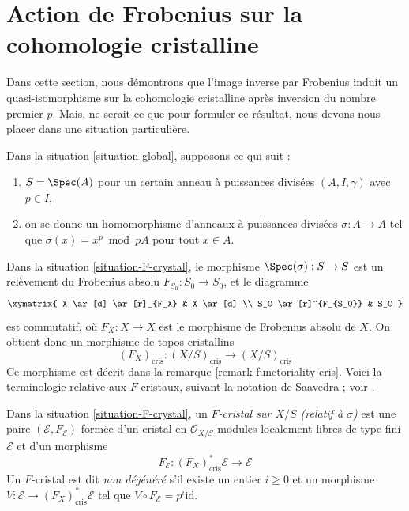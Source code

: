 \section{Action de Frobenius sur la cohomologie cristalline}
\label{section-frobenius}

\noindent
Dans cette section, nous démontrons que l'image inverse par Frobenius induit un quasi-isomorphisme
sur la cohomologie cristalline après inversion du nombre premier $p$. Mais, ne serait-ce que
pour formuler ce résultat, nous devons nous placer dans une situation particulière.

\begin{situation}
\label{situation-F-crystal}
Dans la situation \ref{situation-global}, supposons ce qui suit :
\begin{enumerate}
\item $S = \Spec(A)$ pour un certain anneau à puissances divisées $(A, I, \gamma)$
avec $p \in I$,
\item on se donne un homomorphisme d'anneaux à puissances divisées $\sigma : A \to A$
tel que $\sigma(x) = x^p \bmod pA$ pour tout $x \in A$.
\end{enumerate}
\end{situation}

\noindent
Dans la situation \ref{situation-F-crystal}, le morphisme
$\Spec(\sigma) : S \to S$ est un relèvement du Frobenius absolu
$F_{S_0} : S_0 \to S_0$, et le diagramme
$$
\xymatrix{
X \ar[d] \ar[r]_{F_X} & X \ar[d] \\
S_0 \ar[r]^{F_{S_0}} & S_0
}
$$
est commutatif, où $F_X : X \to X$ est le morphisme de Frobenius absolu
de $X$. On obtient donc un morphisme de topos cristallins
$$
(F_X)_{\text{cris}} :
(X/S)_{\text{cris}}
\longrightarrow
(X/S)_{\text{cris}}
$$
Ce morphisme est décrit dans la remarque \ref{remark-functoriality-cris}. Voici la terminologie relative aux
$F$-cristaux, suivant la notation de Saavedra ; voir
\cite{Saavedra}.

\begin{definition}
\label{definition-F-crystal}
Dans la situation \ref{situation-F-crystal}, un {\it $F$-cristal sur $X/S$
(relatif à $\sigma$)} est une paire $(\mathcal{E}, F_\mathcal{E})$
formée d'un cristal en $\mathcal{O}_{X/S}$-modules localement libres de type fini
$\mathcal{E}$ et d'un morphisme
$$
F_\mathcal{E} : (F_X)_{\text{cris}}^*\mathcal{E} \longrightarrow \mathcal{E}
$$
Un $F$-cristal est dit {\it non dégénéré} s'il existe un entier
$i \geq 0$ et un morphisme $V : \mathcal{E} \to (F_X)_{\text{cris}}^*\mathcal{E}$
tel que $V \circ F_{\mathcal{E}} = p^i \text{id}$.
\end{definition}

